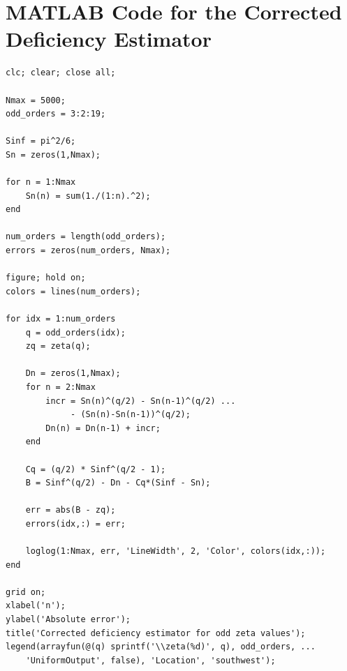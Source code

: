\documentclass[11pt]{article}
\numberwithin{equation}{section}
\theoremstyle{definition}
\begin{document}
\section{MATLAB Code for the Corrected Deficiency Estimator}

\begin{verbatim}
clc; clear; close all;

Nmax = 5000;
odd_orders = 3:2:19;

Sinf = pi^2/6;
Sn = zeros(1,Nmax);

for n = 1:Nmax
    Sn(n) = sum(1./(1:n).^2);
end

num_orders = length(odd_orders);
errors = zeros(num_orders, Nmax);

figure; hold on;
colors = lines(num_orders);

for idx = 1:num_orders
    q = odd_orders(idx);
    zq = zeta(q);

    Dn = zeros(1,Nmax);
    for n = 2:Nmax
        incr = Sn(n)^(q/2) - Sn(n-1)^(q/2) ...
             - (Sn(n)-Sn(n-1))^(q/2);
        Dn(n) = Dn(n-1) + incr;
    end

    Cq = (q/2) * Sinf^(q/2 - 1);
    B = Sinf^(q/2) - Dn - Cq*(Sinf - Sn);

    err = abs(B - zq);
    errors(idx,:) = err;

    loglog(1:Nmax, err, 'LineWidth', 2, 'Color', colors(idx,:));
end

grid on;
xlabel('n');
ylabel('Absolute error');
title('Corrected deficiency estimator for odd zeta values');
legend(arrayfun(@(q) sprintf('\\zeta(%d)', q), odd_orders, ...
    'UniformOutput', false), 'Location', 'southwest');
\end{verbatim}
\end{document}
